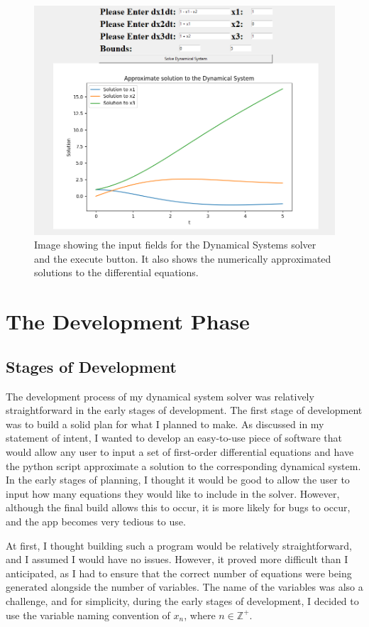 \documentclass[12pt]{report}
\begin{document}
\begin{figure}[H]
    \centering
    \includegraphics[scale = 0.7]{demo 2.png}
    \caption{Image showing the input fields for the Dynamical Systems solver and the execute button. It also shows the numerically approximated solutions to the differential equations.}
    \label{GUI solution}
\end{figure}
\chapter{The Development Phase}
\section{Stages of Development}
The development process of my dynamical system solver was relatively straightforward in the early stages of development. The first stage of development was to build a solid plan for what I planned to make. As discussed in my statement of intent, I wanted to develop an easy-to-use piece of software that would allow any user to input a set of first-order differential equations and have the python script approximate a solution to the corresponding dynamical system. In the early stages of planning, I thought it would be good to allow the user to input how many equations they would like to include in the solver. However, although the final build allows this to occur, it is more likely for bugs to occur, and the app becomes very tedious to use.
\smallskip

At first, I thought building such a program would be relatively straightforward, and I assumed I would have no issues. However, it proved more difficult than I anticipated, as I had to ensure that the correct number of equations were being generated alongside the number of variables. The name of the variables was also a challenge, and for simplicity, during the early stages of development, I decided to use the variable naming convention of $x_{n}$, where $n \in \mathbb{Z}^{+}$.
\end{document}
